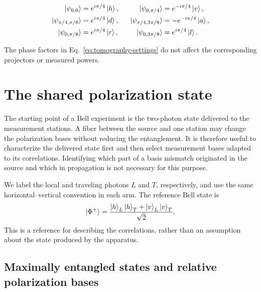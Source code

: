 \documentclass[a4paper,10pt]{article}
\begin{document}
\begin{alignat}{3}
    \ket{\psi_{0,0}}             &=e^{i\pi/4}\ket{h},
    &\qquad
    \ket{\psi_{0,\pi/4}}        &=e^{-i\pi/4}\ket{v}, \notag\\
    \ket{\psi_{\pi/4,\pi/8}}   &=e^{i\pi/4}\ket{d},
    &
    \ket{\psi_{\pi/4,3\pi/8}} &=-e^{-i\pi/4}\ket{a}, \notag\\
    \ket{\psi_{0,\pi/8}}       &=e^{i\pi/4}\ket{r},
    &
    \ket{\psi_{0,3\pi/8}}      &=e^{i\pi/4}\ket{l}.
    \label{eq:tomography-settings}
\end{alignat}

The phase factors in Eq.~\eqref{eq:tomography-settings} do not affect the
corresponding projectors or measured powers.

\section{The shared polarization state}

The starting point of a Bell experiment is the two-photon state delivered to
the measurement stations. A fiber between the source and one station may
change the polarization bases without reducing the entanglement. It is
therefore useful to characterize the delivered state first and then select
measurement bases adapted to its correlations. Identifying which part of a
basis mismatch originated in the source and which in propagation is not
necessary for this purpose.

We label the local and traveling photons $L$ and $T$, respectively, and use
the same horizontal--vertical convention in each arm. The reference Bell
state is
\begin{equation}
    \ket{\Phi^+}
    =\frac{\ket h_L\ket h_T+\ket v_L\ket v_T}{\sqrt{2}}.
    \label{eq:spdc-bell-state}
\end{equation}
This is a reference for describing the correlations, rather than an
assumption about the state produced by the apparatus.

\subsection{Maximally entangled states and relative polarization bases}
\end{document}
